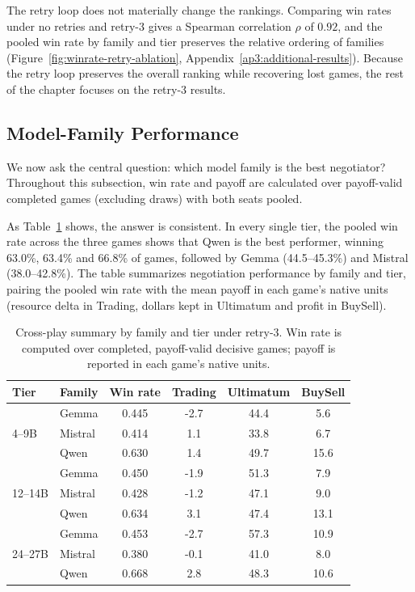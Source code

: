 The retry loop does not materially change the rankings. Comparing win rates under no retries and retry-3 gives a Spearman correlation $\rho$ of $0.92$, and the pooled win rate by family and tier preserves the relative ordering of families (Figure~\ref{fig:winrate-retry-ablation}, Appendix~\ref{ap3:additional-results}). Because the retry loop preserves the overall ranking while recovering lost games, the rest of the chapter focuses on the retry-3 results.

\subsection{Model-Family Performance}


We now ask the central question: which model family is the best negotiator? Throughout this subsection, win rate and payoff are calculated over payoff-valid completed games (excluding draws) with both seats pooled.

As Table~\ref{tab:cross-play-family-summary} shows, the answer is consistent. In every single tier, the pooled win rate across the three games shows that Qwen is the best performer, winning 63.0\%, 63.4\% and 66.8\% of games, followed by Gemma (44.5--45.3\%) and Mistral (38.0--42.8\%). The table summarizes negotiation performance by family and tier, pairing the pooled win rate with the mean payoff in each game's native units (resource delta in Trading, dollars kept in Ultimatum and profit in BuySell).

\begin{table}
\centering
\small
\caption{Cross-play summary by family and tier under retry-3. Win rate is computed over completed, payoff-valid decisive games; payoff is reported in each game's native units.}
\label{tab:cross-play-family-summary}
\begin{tabular}{llcccc}
\toprule
\textbf{Tier} & \textbf{Family} & \textbf{Win rate} & \textbf{Trading} & \textbf{Ultimatum} & \textbf{BuySell} \\
\midrule
\multirow{3}{*}{4--9B}
  & Gemma   & 0.445 & -2.7 & 44.4 &  5.6 \\
  & Mistral & 0.414 &  1.1 & 33.8 &  6.7 \\
  & Qwen    & 0.630 &  1.4 & 49.7 & 15.6 \\
\midrule
\multirow{3}{*}{12--14B}
  & Gemma   & 0.450 & -1.9 & 51.3 &  7.9 \\
  & Mistral & 0.428 & -1.2 & 47.1 &  9.0 \\
  & Qwen    & 0.634 &  3.1 & 47.4 & 13.1 \\
\midrule
\multirow{3}{*}{24--27B}
  & Gemma   & 0.453 & -2.7 & 57.3 & 10.9 \\
  & Mistral & 0.380 & -0.1 & 41.0 &  8.0 \\
  & Qwen    & 0.668 &  2.8 & 48.3 & 10.6 \\
\bottomrule
\end{tabular}
\end{table}

